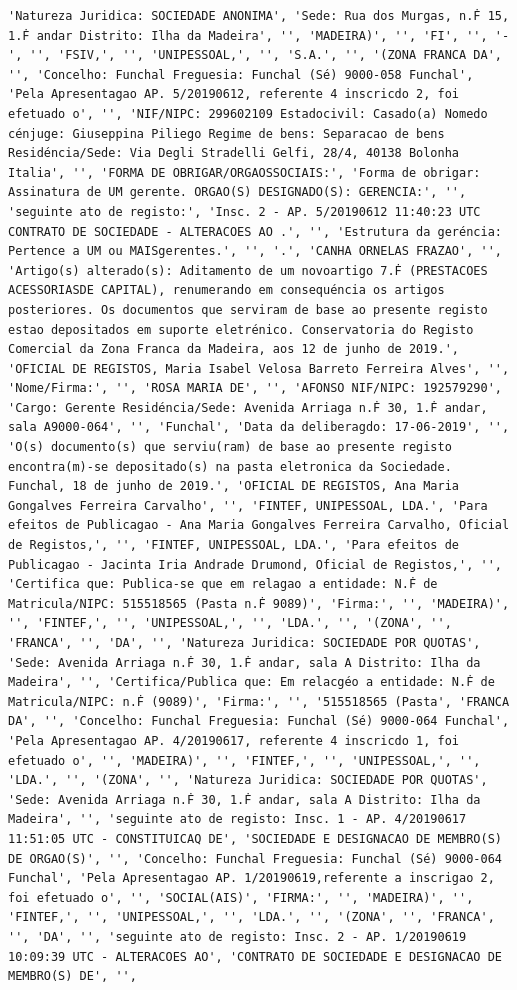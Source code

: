 \documentclass[
  12pt,
]{article}
\begin{document}
\begin{verbatim}
'Natureza Juridica: SOCIEDADE ANONIMA', 'Sede: Rua dos Murgas, n.Ḟ 15, 1.Ḟ andar Distrito: Ilha da Madeira', '', 'MADEIRA)', '', 'FI', '', '-', '', 'FSIV,', '', 'UNIPESSOAL,', '', 'S.A.', '', '(ZONA FRANCA DA', '', 'Concelho: Funchal Freguesia: Funchal (Sé) 9000-058 Funchal', 'Pela Apresentagao AP. 5/20190612, referente 4 inscricdo 2, foi efetuado o', '', 'NIF/NIPC: 299602109 Estadocivil: Casado(a) Nomedo cénjuge: Giuseppina Piliego Regime de bens: Separacao de bens Residéncia/Sede: Via Degli Stradelli Gelfi, 28/4, 40138 Bolonha Italia', '', 'FORMA DE OBRIGAR/ORGAOSSOCIAIS:', 'Forma de obrigar: Assinatura de UM gerente. ORGAO(S) DESIGNADO(S): GERENCIA:', '', 'seguinte ato de registo:', 'Insc. 2 - AP. 5/20190612 11:40:23 UTC CONTRATO DE SOCIEDADE - ALTERACOES AO .', '', 'Estrutura da geréncia: Pertence a UM ou MAISgerentes.', '', '.', 'CANHA ORNELAS FRAZAO', '', 'Artigo(s) alterado(s): Aditamento de um novoartigo 7.Ḟ (PRESTACOES ACESSORIASDE CAPITAL), renumerando em consequéncia os artigos posteriores. Os documentos que serviram de base ao presente registo estao depositados em suporte eletrénico. Conservatoria do Registo Comercial da Zona Franca da Madeira, aos 12 de junho de 2019.', 'OFICIAL DE REGISTOS, Maria Isabel Velosa Barreto Ferreira Alves', '', 'Nome/Firma:', '', 'ROSA MARIA DE', '', 'AFONSO NIF/NIPC: 192579290', 'Cargo: Gerente Residéncia/Sede: Avenida Arriaga n.Ḟ 30, 1.Ḟ andar, sala A9000-064', '', 'Funchal', 'Data da deliberagdo: 17-06-2019', '', 'O(s) documento(s) que serviu(ram) de base ao presente registo encontra(m)-se depositado(s) na pasta eletronica da Sociedade. Funchal, 18 de junho de 2019.', 'OFICIAL DE REGISTOS, Ana Maria Gongalves Ferreira Carvalho', '', 'FINTEF, UNIPESSOAL, LDA.', 'Para efeitos de Publicagao - Ana Maria Gongalves Ferreira Carvalho, Oficial de Registos,', '', 'FINTEF, UNIPESSOAL, LDA.', 'Para efeitos de Publicagao - Jacinta Iria Andrade Drumond, Oficial de Registos,', '', 'Certifica que: Publica-se que em relagao a entidade: N.Ḟ de Matricula/NIPC: 515518565 (Pasta n.Ḟ 9089)', 'Firma:', '', 'MADEIRA)', '', 'FINTEF,', '', 'UNIPESSOAL,', '', 'LDA.', '', '(ZONA', '', 'FRANCA', '', 'DA', '', 'Natureza Juridica: SOCIEDADE POR QUOTAS', 'Sede: Avenida Arriaga n.Ḟ 30, 1.Ḟ andar, sala A Distrito: Ilha da Madeira', '', 'Certifica/Publica que: Em relacgéo a entidade: N.Ḟ de Matricula/NIPC: n.Ḟ (9089)', 'Firma:', '', '515518565 (Pasta', 'FRANCA DA', '', 'Concelho: Funchal Freguesia: Funchal (Sé) 9000-064 Funchal', 'Pela Apresentagao AP. 4/20190617, referente 4 inscricdo 1, foi efetuado o', '', 'MADEIRA)', '', 'FINTEF,', '', 'UNIPESSOAL,', '', 'LDA.', '', '(ZONA', '', 'Natureza Juridica: SOCIEDADE POR QUOTAS', 'Sede: Avenida Arriaga n.Ḟ 30, 1.Ḟ andar, sala A Distrito: Ilha da Madeira', '', 'seguinte ato de registo: Insc. 1 - AP. 4/20190617 11:51:05 UTC - CONSTITUICAQ DE', 'SOCIEDADE E DESIGNACAO DE MEMBRO(S) DE ORGAO(S)', '', 'Concelho: Funchal Freguesia: Funchal (Sé) 9000-064 Funchal', 'Pela Apresentagao AP. 1/20190619,referente a inscrigao 2, foi efetuado o', '', 'SOCIAL(AIS)', 'FIRMA:', '', 'MADEIRA)', '', 'FINTEF,', '', 'UNIPESSOAL,', '', 'LDA.', '', '(ZONA', '', 'FRANCA', '', 'DA', '', 'seguinte ato de registo: Insc. 2 - AP. 1/20190619 10:09:39 UTC - ALTERACOES AO', 'CONTRATO DE SOCIEDADE E DESIGNACAO DE MEMBRO(S) DE', '', 
\end{verbatim}
\end{document}
